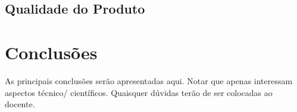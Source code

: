 \documentclass[openany,10pt,a4paper]{article}
\begin{document}
\subsection{Qualidade do Produto}

\section{Conclusões}

As principais conclusões serão apresentadas aqui. Notar que apenas interessam aspectos técnico/ científicos. Quaisquer dúvidas terão de ser colocadas ao docente.

\renewcommand\bibname{Referências} %
 
   
\end{document}
